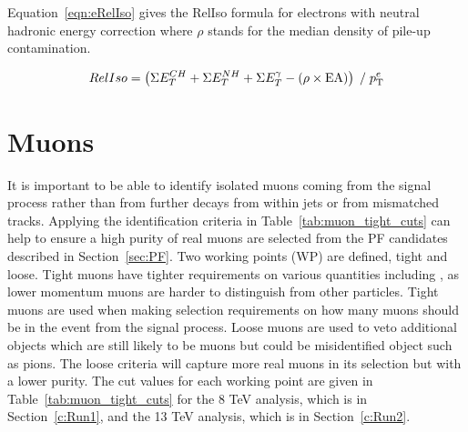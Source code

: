 
Equation~\ref{eqn:eRelIso} gives the RelIso formula for electrons with neutral hadronic energy correction where $\rho$ stands for the median density of pile-up contamination.

\begin{centering}
\begin{equation}
RelIso = \left( \Sigma E_{T}^{CH} + \Sigma E_{T}^{NH} + \Sigma E_{T}^{\gamma} - (\rho\times\textrm{EA}) \right) \; / \;   p_{\mathrm{T}}^{e}
\label{eqn:eRelIso}
\end{equation}
\end{centering}


\section{Muons \label{sec:muonreco}}

It is important to be able to identify isolated muons coming from the signal process rather than from further decays from within jets or from mismatched tracks. Applying the identification criteria in Table~\ref{tab:muon_tight_cuts} can help to ensure a high purity of real muons are selected from the PF candidates described in Section~\ref{sec:PF}. Two working points (WP) are defined, tight and loose. Tight muons have tighter requirements on various quantities including \pt, as lower momentum muons are harder to distinguish from other particles. Tight muons are used when making selection requirements on how many muons should be in the event from the signal process. Loose muons are used to veto additional objects which are still likely to be muons but could be misidentified object such as pions. The loose criteria will capture more real muons in its selection but with a lower purity.
The cut values for each working point are given in Table~\ref{tab:muon_tight_cuts} for the 8 TeV analysis, which is in Section~\ref{c:Run1}, and the 13 TeV analysis, which is in Section~\ref{c:Run2}.

